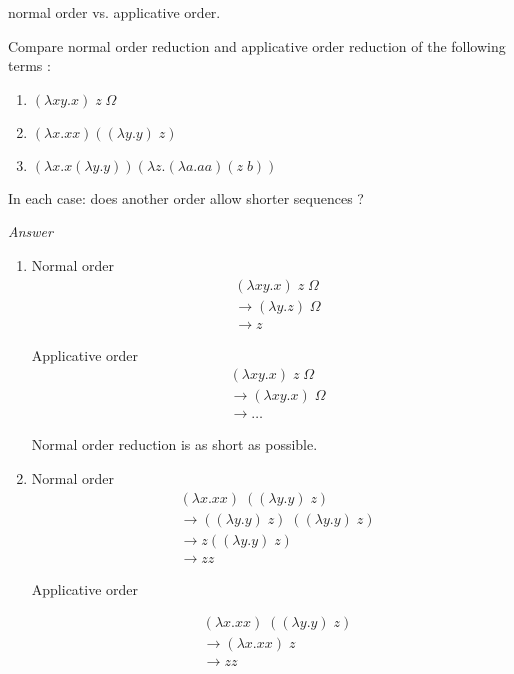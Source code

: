   \exo normal order vs. applicative order.

  Compare normal order reduction and applicative order reduction of the
  following terms :

  \begin{enumerate}
    \item $(\lambda xy.x)\;z\;\Omega$
    \item $(\lambda x.xx)((\lambda y.y)\;z)$
    \item $(\lambda x.x(\lambda y.y)) (\lambda z.(\lambda a.aa)(z\;b))$
  \end{enumerate}

  In each case: does another order allow shorter sequences ?

  \textit{Answer}

  \begin{enumerate}
    \item Normal order
      \begin{align*}
        &(\lambda xy.x)\;z\;\Omega\\
        &\to (\lambda y.z)\; \Omega\\
        &\to z
      \end{align*}

      Applicative order
      \begin{align*}
        &(\lambda xy.x)\;z\;\Omega\\
        &\to (\lambda xy.x)\; \Omega\\
        &\to \ldots
      \end{align*}

      Normal order reduction is as short as possible.

    \item Normal order
      \begin{align*}
        &(\lambda x.xx)\;((\lambda y.y)\;z) \\
        &\to ((\lambda y.y)\; z)\;((\lambda y.y)\;z) \\
        &\to z ((\lambda y.y)\;z) \\
        &\to zz
      \end{align*}

      Applicative order

      \begin{align*}
        &(\lambda x.xx)\;((\lambda y.y)\;z) \\
        &\to (\lambda x.xx)\;z \\
        &\to zz
      \end{align*}


\end{enumerate}
